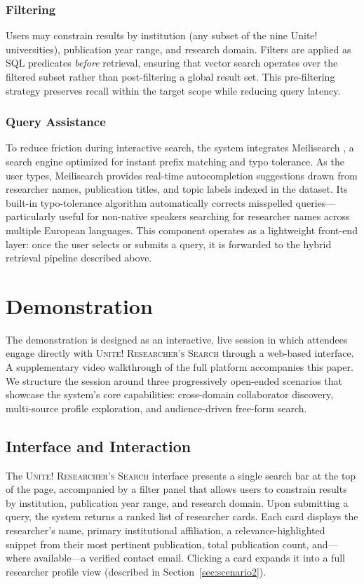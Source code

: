 \documentclass[sigconf, nonacm]{acmart}
\begin{document}
\subsubsection*{Filtering}
Users may constrain results by institution (any subset of the nine Unite! universities), publication year range, and research domain. Filters are applied as SQL predicates \emph{before} retrieval, ensuring that vector search operates over the filtered subset rather than post-filtering a global result set. This pre-filtering strategy preserves recall within the target scope while reducing query latency.

\subsubsection*{Query Assistance}
To reduce friction during interactive search, the system integrates Meilisearch \cite{meilisearch2024}, a search engine optimized for instant prefix matching and typo tolerance. As the user types, Meilisearch provides real-time autocompletion suggestions drawn from researcher names, publication titles, and topic labels indexed in the dataset. Its built-in typo-tolerance algorithm automatically corrects misspelled queries---particularly useful for non-native speakers searching for researcher names across multiple European languages. This component operates as a lightweight front-end layer: once the user selects or submits a query, it is forwarded to the hybrid retrieval pipeline described above.

\section{Demonstration}
\label{sec:demo}

The demonstration is designed as an interactive, live session in which attendees engage directly with \textsc{Unite! Researcher's Search} through a web-based interface. A supplementary video walkthrough of the full platform accompanies this paper. We structure the session around three progressively open-ended scenarios that showcase the system's core capabilities: cross-domain collaborator discovery, multi-source profile exploration, and audience-driven free-form search.

\subsection{Interface and Interaction}

The \textsc{Unite! Researcher's Search} interface presents a single search bar at the top of the page, accompanied by a filter panel that allows users to constrain results by institution, publication year range, and research domain. Upon submitting a query, the system returns a ranked list of researcher cards. Each card displays the researcher's name, primary institutional affiliation, a relevance-highlighted snippet from their most pertinent publication, total publication count, and---where available---a verified contact email. Clicking a card expands it into a full researcher profile view (described in Section~\ref{sec:scenario2}).
\end{document}
